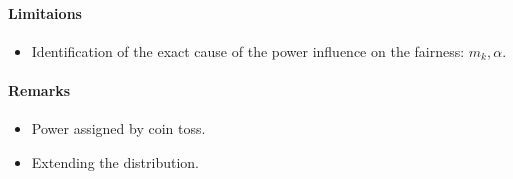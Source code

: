 \documentclass[../root]{subfiles}
\begin{document}
    \paragraph{Limitaions}

    \begin{itemize}
      \item Identification of the exact cause of the power influence on the fairness: $m_k, \alpha$.
    \end{itemize}

    \paragraph{Remarks}

    \begin{itemize}
      \item Power assigned by coin toss.
      \item Extending the distribution.
    \end{itemize}



    \biblio
\end{document}
